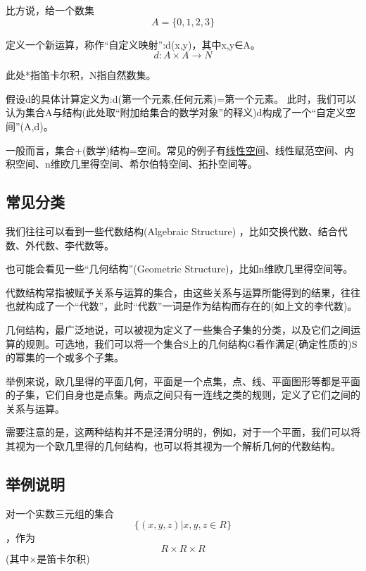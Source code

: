 比方说，给一个数集
\begin{equation}
A = \{ 0,1,2,3 \}
\end{equation}

定义一个新运算，称作“自定义映射”:d(x,y)，其中x,y∈A。
\begin{equation}
d:A \times A  \to N
\end{equation}

此处*指笛卡尔积，N指自然数集。

假设d的具体计算定义为:d(第一个元素,任何元素)=第一个元素。
此时，我们可以认为集合A与结构(此处取“附加给集合的数学对象”的释义)d构成了一个“自定义空间”(A,d)。

一般而言，集合+(数学)结构=空间。常见的例子有\href{https://wuli.wiki/online/LSpace.html}{线性空间}、线性赋范空间、内积空间、n维欧几里得空间、希尔伯特空间、拓扑空间等。

\subsection{常见分类}
我们往往可以看到一些代数结构(Algebraic Structure) ，比如交换代数、结合代数、外代数、李代数等。

也可能会看见一些“几何结构”(Geometric Structure)，比如n维欧几里得空间等。

代数结构常指被赋予关系与运算的集合，由这些关系与运算所能得到的结果，往往也就构成了一个“代数”，此时“代数”一词是作为结构而存在的(如上文的李代数)。

几何结构，最广泛地说，可以被视为定义了一些集合子集的分类，以及它们之间运算的规则。可选地，我们可以将一个集合S上的几何结构G看作满足(确定性质的)S的幂集的一个或多个子集。 

举例来说，欧几里得的平面几何，平面是一个点集，点、线、平面图形等都是平面的子集，它们自身也是点集。两点之间只有一连线之类的规则，定义了它们之间的关系与运算。

需要注意的是，这两种结构并不是泾渭分明的，例如，对于一个平面，我们可以将其视为一个欧几里得的几何结构，也可以将其视为一个解析几何的代数结构。

\subsection{举例说明}
对一个实数三元组的集合
\begin{equation}
\{(x,y,z)|x,y,z \in R \}
\end{equation}
，作为
\begin{equation}
R \times R \times R
\end{equation}
(其中×是笛卡尔积)

